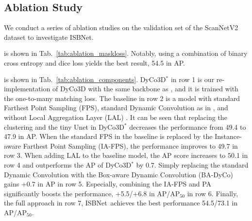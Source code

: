 \documentclass[10pt,twocolumn,letterpaper]{article}
\def\Approach{ISBNet}
\begin{document}
\subsection{Ablation Study}
We conduct a series of ablation studies on the validation set of the ScanNetV2 dataset to investigate \Approach.

 is shown in Tab.~\ref{tab:ablation_maskloss}. Notably, using a combination of binary cross entropy and dice loss yields the best result, 54.5 in AP.

 is shown in Tab.~\ref{tab:ablation_components}. DyCo3D$^\ast$ in row 1 is our re-implementation of DyCo3D with the same backbone as \cite{chen2021hierarchical,vu2022softgroup,wu2022dknet}, and it is trained with the one-to-many matching loss.
The baseline in row 2 is a model with standard Farthest Point Sampling (FPS), standard Dynamic Convolution as in \cite{he2021dyco3d,He2022PointInst3DS3,wu2022dknet}, and without Local Aggregation Layer (LAL) 
. It can be seen that replacing the clustering and the tiny Unet in DyCo3D$^\ast$ decreases the performance from 49.4 to 47.9 in AP. When the standard FPS in the baseline is replaced by the Instance-aware Farthest Point Sampling (IA-FPS), the performance improves to 49.7 in row 3. When adding LAL to the baseline model, the AP score increases to 50.1 in row 4 and outperforms the AP of DyCo3D$^\ast$ by 0.7. 
Simply replacing the standard Dynamic Convolution with the Box-aware Dynamic Convolution (BA-DyCo) gains +0.7 in AP in row 5.
Especially, combining the IA-FPS and PA significantly boosts the performance, +5.5/+6.8 in AP/AP$_{50}$ in row 6. Finally, the full approach in row 7, \Approach~achieves the best performance 54.5/73.1 in AP/AP$_{50}$.
\end{document}
